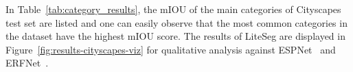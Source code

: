 \documentclass[conference,a4paper]{IEEEtran}
\begin{document}
\begin{table}[h!]
	\caption{Category results of our LiteSeg models on Cityscapes test set. All number represent the mIOU. }

	\begin{center}
	\end{center}
	\label{tab:category_results}
	\vskip -0.2in
\end{table}

In Table~\ref{tab:category_results}, the mIOU of the main categories of Cityscapes test set are listed and one can easily observe that the most common categories in the dataset have the highest mIOU score. The results of LiteSeg are displayed in Figure~\ref{fig:results-cityscapes-viz} for qualitative analysis against ESPNet~\cite{espnet} and ERFNet~\cite{erfnet}.
\end{document}
